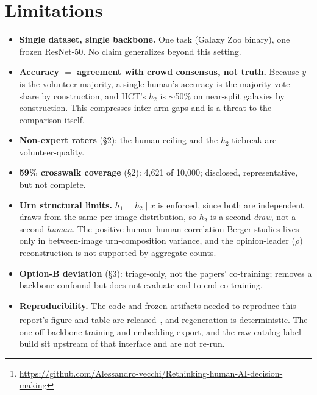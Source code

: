\documentclass[10pt]{article}
\begin{document}
\section{Limitations}

\begin{itemize}
  \item \textbf{Single dataset, single backbone.} One task (Galaxy Zoo binary), one frozen
    ResNet-50. No claim generalizes beyond this setting.
  \item \textbf{Accuracy $=$ agreement with crowd consensus, not truth.} Because $y$ is the
    volunteer majority, a single human's accuracy is the majority vote share by construction, and
    HCT's $h_2$ is $\sim$50\% on near-split galaxies by construction. This compresses inter-arm gaps
    and is a threat to the comparison itself.
  \item \textbf{Non-expert raters} (\S2): the human ceiling and the $h_2$ tiebreak are
    volunteer-quality.
  \item \textbf{59\% crosswalk coverage} (\S2): 4{,}621 of 10{,}000; disclosed, representative, but
    not complete.
  \item \textbf{Urn structural limits.} $h_1 \perp h_2 \mid x$ is enforced, since both are
    independent draws from the same per-image distribution, so $h_2$ is a second \emph{draw}, not a
    second \emph{human}. The positive human--human correlation Berger studies lives only in
    between-image urn-composition variance, and the opinion-leader ($\rho$) reconstruction is not
    supported by aggregate counts.
  \item \textbf{Option-B deviation} (\S3): triage-only, not the papers' co-training; removes a
    backbone confound but does not evaluate end-to-end co-training.
  \item \textbf{Reproducibility.} The code and frozen artifacts needed to reproduce this report's
    figure and table are released\footnote{\url{https://github.com/Alessandro-vecchi/Rethinking-human-AI-decision-making}}, and regeneration is deterministic. The one-off backbone training
    and embedding export, and the raw-catalog label build sit upstream of that interface and are
    not re-run.
\end{itemize}



\end{document}
